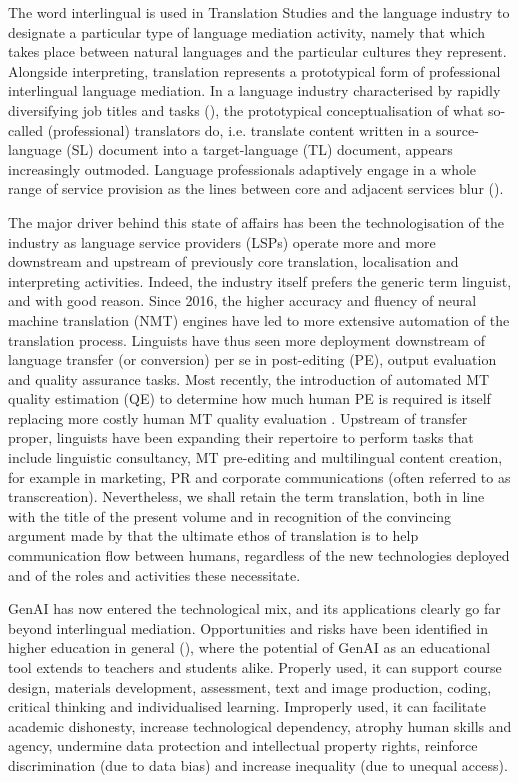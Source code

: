\documentclass[output=paper]{langscibook}
\begin{document}
The word interlingual is used in Translation Studies and the language industry to designate a particular type of language mediation activity, namely that which takes place between natural languages and the particular cultures they represent. Alongside interpreting, translation represents a prototypical form of professional interlingual language mediation. In a language industry characterised by rapidly diversifying job titles and tasks (\cites{bond_stunning_2018}[11--17]{slator_slator_2020}), the prototypical conceptualisation of what so-called (professional) translators do, i.e. translate content written in a source-language (SL) document into a target-language (TL) document, appears increasingly outmoded. Language professionals adaptively engage in a whole range of service provision as the lines between core and adjacent services blur (\cites{angelone_weaving_2023}[3--5]{angelone_introduction_2024}). 

The major driver behind this state of affairs has been the technologisation of the industry as language service providers (LSPs) operate more and more downstream and upstream of previously core translation, localisation and interpreting activities. Indeed, the industry itself prefers the generic term linguist, and with good reason. Since 2016, the higher accuracy and fluency of neural machine translation (NMT) engines have led to more extensive automation of the translation process. Linguists have thus seen more deployment downstream of language transfer (or conversion) per se in post-editing (PE), output evaluation and quality assurance tasks. Most recently, the introduction of automated MT quality estimation (QE) to determine how much human PE is required is itself replacing more costly human MT quality evaluation \citep[50--51]{slator_slator_2024}. Upstream of transfer proper, linguists have been expanding their repertoire to perform tasks that include linguistic consultancy, MT pre-editing and multilingual content creation, for example in marketing, PR and corporate communications (often referred to as transcreation). Nevertheless, we shall retain the term translation, both in line with the title of the present volume and in recognition of the convincing argument made by \citet{do_carmo_differentiating_2021} that the ultimate ethos of translation is to help communication flow between humans, regardless of the new technologies deployed and of the roles and activities these necessitate.

GenAI has now entered the technological mix, and its applications clearly go far beyond interlingual mediation. Opportunities and risks have been identified in higher education in general (\citealt{atlas_chatgpt_2023, gimpel_unlocking_2023, oecd_opportunities_2023}), where the potential of GenAI as an educational tool extends to teachers and students alike. Properly used, it can support course design, materials development, assessment, text and image production, coding, critical thinking and individualised learning. Improperly used, it can facilitate academic dishonesty, increase technological dependency, atrophy human skills and agency, undermine data protection and intellectual property rights, reinforce discrimination (due to data bias) and increase inequality (due to unequal access).
\end{document}
